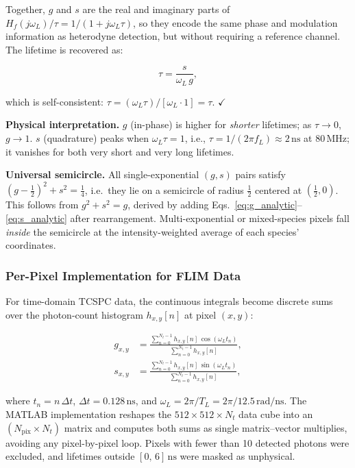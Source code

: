 \documentclass[conference]{IEEEtran}
\begin{document}
Together, $g$ and $s$ are the real and imaginary parts of
$H_f(j\omega_L)/\tau = 1/(1+j\omega_L\tau)$, so they encode the same
phase and modulation information as heterodyne detection, but without
requiring a reference channel.
The lifetime is recovered as:

\begin{equation}
    \tau = \frac{s}{\omega_L\,g},
    \label{eq:tau_phasor}
\end{equation}

which is self-consistent:
$\tau = (\omega_L\tau)/[\omega_L\cdot 1] = \tau$. $\checkmark$

\textbf{Physical interpretation.}
$g$ (in-phase) is higher for \emph{shorter} lifetimes; as
$\tau\to 0$, $g\to 1$.
$s$ (quadrature) peaks when $\omega_L\tau = 1$, i.e.,
$\tau = 1/(2\pi f_L) \approx 2\,\text{ns}$ at 80\,MHz; it vanishes
for both very short and very long lifetimes.

\textbf{Universal semicircle.}
All single-exponential $(g,s)$ pairs satisfy
$(g - \tfrac{1}{2})^2 + s^2 = \tfrac{1}{4}$, i.e.\ they lie on a
semicircle of radius $\tfrac{1}{2}$ centered at $(\tfrac{1}{2},0)$.
This follows from $g^2 + s^2 = g$, derived by adding
Eqs.~\eqref{eq:g_analytic}--\eqref{eq:s_analytic} after rearrangement.
Multi-exponential or mixed-species pixels fall \emph{inside} the
semicircle at the intensity-weighted average of each species' coordinates.

\subsubsection{Per-Pixel Implementation for FLIM Data}
For time-domain TCSPC data, the continuous integrals become discrete
sums over the photon-count histogram $h_{x,y}[n]$ at pixel $(x,y)$:

\begin{align}
    g_{x,y} &= \frac{\displaystyle\sum_{n=0}^{N_t-1}
                     h_{x,y}[n]\,\cos(\omega_L t_n)}
                    {\displaystyle\sum_{n=0}^{N_t-1} h_{x,y}[n]},
    \label{eq:g_discrete} \\[4pt]
    s_{x,y} &= \frac{\displaystyle\sum_{n=0}^{N_t-1}
                     h_{x,y}[n]\,\sin(\omega_L t_n)}
                    {\displaystyle\sum_{n=0}^{N_t-1} h_{x,y}[n]},
    \label{eq:s_discrete}
\end{align}

where $t_n = n\,\Delta t$, $\Delta t = 0.128\,\text{ns}$, and
$\omega_L = 2\pi/T_L = 2\pi/12.5\,\text{rad/ns}$.
The MATLAB implementation reshapes the $512\times512\times N_t$ data
cube into an $(N_\text{pix}\times N_t)$ matrix and computes both sums
as single matrix--vector multiplies, avoiding any pixel-by-pixel loop.
Pixels with fewer than 10 detected photons were excluded, and lifetimes
outside $[0,\,6]\,\text{ns}$ were masked as unphysical.
\end{document}
